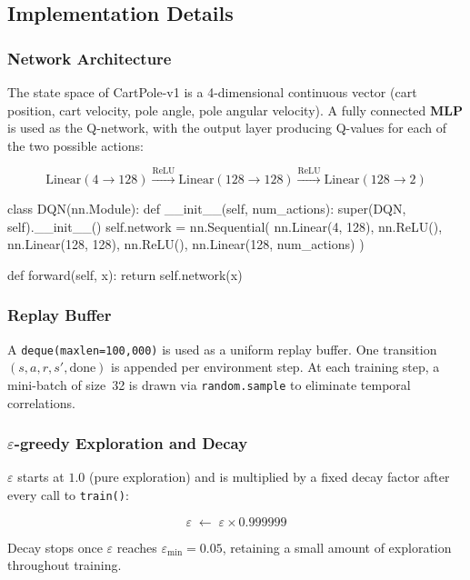 \documentclass[12pt,a4paper]{report}
\begin{document}
\subsection{Implementation Details}

\subsubsection*{Network Architecture}

The state space of CartPole-v1 is a 4-dimensional continuous vector
(cart position, cart velocity, pole angle, pole angular velocity).
A fully connected \textbf{MLP} is used as the Q-network, with the output layer
producing Q-values for each of the two possible actions:

\[
  \text{Linear}(4\!\to\!128) \xrightarrow{\text{ReLU}}
  \text{Linear}(128\!\to\!128) \xrightarrow{\text{ReLU}}
  \text{Linear}(128\!\to\!2)
\]

\begin{pycode}
class DQN(nn.Module):
    def __init__(self, num_actions):
        super(DQN, self).__init__()
        self.network = nn.Sequential(
            nn.Linear(4, 128),
            nn.ReLU(),
            nn.Linear(128, 128),
            nn.ReLU(),
            nn.Linear(128, num_actions)
        )

    def forward(self, x):
        return self.network(x)
\end{pycode}

\subsubsection*{Replay Buffer}

A \texttt{deque(maxlen=100{,}000)} is used as a uniform replay buffer.
One transition $(s, a, r, s', \text{done})$ is appended per environment step.
At each training step, a mini-batch of size~32 is drawn via \texttt{random.sample}
to eliminate temporal correlations.

\subsubsection*{$\varepsilon$-greedy Exploration and Decay}

$\varepsilon$ starts at $1.0$ (pure exploration) and is multiplied by a fixed decay factor
after every call to \texttt{train()}:

\[
  \varepsilon \;\leftarrow\; \varepsilon \times 0.999999
\]

Decay stops once $\varepsilon$ reaches $\varepsilon_{\min} = 0.05$,
retaining a small amount of exploration throughout training.
\end{document}

